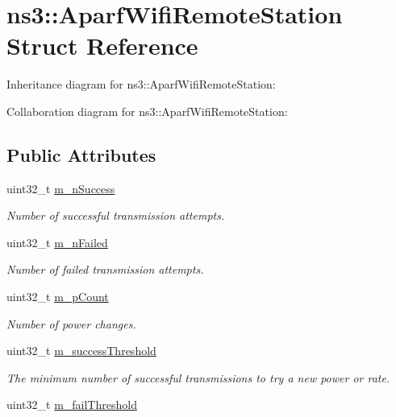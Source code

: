 \hypertarget{structns3_1_1AparfWifiRemoteStation}{}\section{ns3\+:\+:Aparf\+Wifi\+Remote\+Station Struct Reference}
\label{structns3_1_1AparfWifiRemoteStation}


Inheritance diagram for ns3\+:\+:Aparf\+Wifi\+Remote\+Station\+:


Collaboration diagram for ns3\+:\+:Aparf\+Wifi\+Remote\+Station\+:
\subsection*{Public Attributes}
\begin{DoxyCompactItemize}
\item 
uint32\+\_\+t \hyperlink{structns3_1_1AparfWifiRemoteStation_a57ea10ff8cffee4470e883da2e65056c}{m\+\_\+n\+Success}
\begin{DoxyCompactList}\small\item\em Number of successful transmission attempts. \end{DoxyCompactList}\item 
uint32\+\_\+t \hyperlink{structns3_1_1AparfWifiRemoteStation_af40ac5d17a7860c482abed0f1824db99}{m\+\_\+n\+Failed}
\begin{DoxyCompactList}\small\item\em Number of failed transmission attempts. \end{DoxyCompactList}\item 
uint32\+\_\+t \hyperlink{structns3_1_1AparfWifiRemoteStation_a7bc57fe2650ed9f1c6ba1607369811a3}{m\+\_\+p\+Count}
\begin{DoxyCompactList}\small\item\em Number of power changes. \end{DoxyCompactList}\item 
uint32\+\_\+t \hyperlink{structns3_1_1AparfWifiRemoteStation_a231765edd2ba7b5a9152819770adea26}{m\+\_\+success\+Threshold}
\begin{DoxyCompactList}\small\item\em The minimum number of successful transmissions to try a new power or rate. \end{DoxyCompactList}\item 
uint32\+\_\+t \hyperlink{structns3_1_1AparfWifiRemoteStation_a5821ba097d28ec6b7db0101cf52227c5}{m\+\_\+fail\+Threshold}

\end{DoxyCompactItemize}
